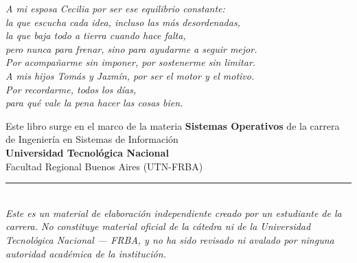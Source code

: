 \newpage
\thispagestyle{empty}
\null\vspace*{4.5cm}

\begin{flushright}
\begin{minipage}{0.72\textwidth}
  \setlength{\parskip}{0.5em}
  \raggedleft\itshape
  A mi esposa Cecilia por ser ese equilibrio constante:\\[0.2em]
  la que escucha cada idea, incluso las más desordenadas,\\
  la que baja todo a tierra cuando hace falta,\\
  pero nunca para frenar, sino para ayudarme a seguir mejor.\\
  Por acompañarme sin imponer, por sostenerme sin limitar.\\[0.8em]
  A mis hijos Tomás y Jazmín, por ser el motor y el motivo.\\
  Por recordarme, todos los días,\\
  para qué vale la pena hacer las cosas bien.
\end{minipage}
\end{flushright}

\newpage
\thispagestyle{empty}
\null\vfill

\begin{center}
\begin{minipage}{0.78\textwidth}
\begin{tcolorbox}[
  colback=gray!5,
  colframe=black!40,
  arc=2pt,
  boxrule=0.4pt,
  left=13pt, right=13pt, top=10pt, bottom=10pt
]
{\small\centering
Este libro surge en el marco de la materia \textbf{Sistemas Operativos}
de la carrera de Ingeniería en Sistemas de Información\\[0.4em]
\textbf{Universidad Tecnológica Nacional}\\
Facultad Regional Buenos Aires (UTN-FRBA)\\[0.9em]
\noindent\rule{0.5\linewidth}{0.25pt}\\[0.7em]
\textit{Este es un material de elaboración independiente creado por un
estudiante de la carrera. No constituye material oficial de la cátedra
ni de la Universidad Tecnológica Nacional — FRBA, y no ha sido revisado
ni avalado por ninguna autoridad académica de la institución.}
}
\end{tcolorbox}
\end{minipage}
\end{center}

\null\vspace*{2.5cm}

\newpage
\thispagestyle{empty}
\null